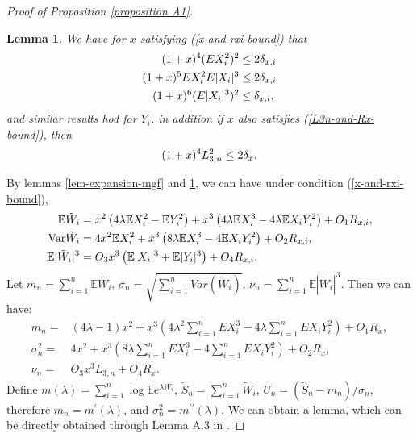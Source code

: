 \documentclass[bj,authoryear]{imsart}
\numberwithin{equation}{section}
\theoremstyle{plain}
\newtheorem{lem}{Lemma}[section]
\theoremstyle{definition}
\begin{document}
\begin{proof}[Proof of Proposition \ref{proposition A1}]
\begin{lem}\label{lem-X-Y-moment-upper-bound}
We have for $x$ satisfying (\ref{x-and-rxi-bound}) that
\begin{align}
  (1+x)^4(EX_i^2)^2&\leq 2\delta_{x,i}\notag\\
  (1+x)^5EX_i^2E|X_i|^3&\leq 2\delta_{x,i}\notag\\
  (1+x)^6(E|X_i|^3)^2&\leq \delta_{x,i},\notag
\end{align}
and similar results hod for $Y_i$. in addition if $x$ also satisfies (\ref{L3n-and-Rx-bound}), then 
\begin{align}
  (1+x)^4L_{3,n}^2\leq 2\delta_x\notag.
\end{align}
\end{lem}
By lemmas \ref{lem-expansion-mgf} and \ref{lem-X-Y-moment-upper-bound}, we can have under condition (\ref{x-and-rxi-bound}),
\begin{align}
  \mathbb{E} \tilde{W}_i &= x^2\left(4\lambda\mathbb{E}X_i^2-\mathbb{E}Y_i^2\right)+x^3\left(4\lambda\mathbb{E}X_i^3-4\lambda\mathbb{E}X_iY_i^2\right) + O_1R_{x,i},\notag\\
  \text{Var}\tilde{W}_i& = 4x^2\mathbb{E}X_i^2+x^3\left(8\lambda \mathbb{E}X_i^3-4\mathbb{E}X_iY_i^2\right)+O_2R_{x,i},\notag\\
  \mathbb{E}|\tilde{W}_i|^3 &= O_3x^3\left(\mathbb{E}|X_i|^3+\mathbb{E}|Y_i|^3\right)+O_4R_{x,i}.\notag
\end{align}
Let $m_n = \sum_{i=1}^{n}\mathbb{E} \tilde{W_i}$, $\sigma_n = \sqrt{\sum_{i=1}^{n}Var(\tilde{W}_i)}$, $\nu_n = \sum_{i=1}^{n}\mathbb{E} |\tilde{W}_i|^3$. Then we can have:
\begin{align}
  m_n = &  (4\lambda -1)x^2+x^3\left(4\lambda^2\sum_{i=1}^{n}EX_i^3-4\lambda\sum_{i=1}^{n}EX_iY_i^2\right)+O_1R_x,\label{m_n}\\
  \sigma_n^2 = & 4x^2+x^3\left(8\lambda\sum_{i=1}^{n}EX_i^3-4\sum_{i=1}^{n}EX_iY_i^2\right)+O_2R_x,\label{sigma_n}\\
  \nu_n = &  O_3x^3L_{3,n}+O_4R_x.\label{nu_n}
\end{align}
Define $m(\lambda) = \sum_{i=1}^{n}\log\mathbb{E} e^{\lambda W_i}$, $\tilde{S}_n = \sum_{i = 1}^{n}\tilde{W}_i$, $U_n = \left(\tilde{S}_n - m_n\right)/\sigma_n$, therefore $m_n = m^{\prime}(\lambda)$, and $\sigma_{n}^{2} = m^{\prime\prime}(\lambda)$. We can obtain a lemma, which can be directly obtained through Lemma A.3 in \cite{gao2022refined}.


\end{proof}
\end{document}
